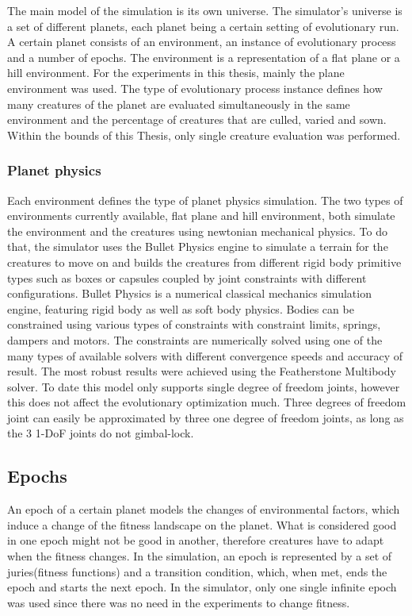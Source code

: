 \documentclass[main]{subfiles}
\begin{document}
The main model of the simulation is its own universe. %
%
The simulator's universe is a set of different planets, each planet being a certain setting of evolutionary run. %
%
A certain planet consists of an environment, an instance of evolutionary process and a number of epochs. %
%
The environment is a representation of a flat plane or a hill environment. %
%
For the experiments in this thesis, mainly the plane environment was used. %
%
The type of evolutionary process instance defines how many creatures of the planet are evaluated simultaneously in the same environment and the percentage of creatures that are culled, varied and sown. %
%
Within the bounds of this Thesis, only single creature evaluation was performed. 

\subsubsection{Planet physics}

Each environment defines the type of planet physics simulation. %
%
The two types of environments currently available, flat plane and hill environment, both simulate the environment and the creatures using newtonian mechanical physics. %
%
To do that, the simulator uses the Bullet Physics engine\cite{bib:BulletPhysics2015} to simulate a terrain for the creatures to move on and builds the creatures from different rigid body primitive types such as boxes or capsules coupled by joint constraints with different configurations. %
%
Bullet Physics is a numerical classical mechanics simulation engine, featuring rigid body as well as soft body physics. %
%
Bodies can be constrained using various types of constraints with constraint limits, springs, dampers and motors. %
%
The constraints are numerically solved using one of the many types of available solvers with different convergence speeds and accuracy of result. %
%
The most robust results were achieved using the Featherstone Multibody solver. %
%
To date this model only supports single degree of freedom joints, however this does not affect the evolutionary optimization much. %
%
Three degrees of freedom joint can easily be approximated by three one degree of freedom joints, as long as the 3 1-DoF joints do not gimbal-lock.

\subsection{Epochs}

An epoch of a certain planet models the changes of environmental factors, which induce a change of the fitness landscape on the planet. %
%
What is considered good in one epoch might not be good in another, therefore creatures have to adapt when the fitness changes. %
%
In the simulation, an epoch is represented by a set of juries(fitness functions) and a transition condition, which, when met, ends the epoch and starts the next epoch. %
%
In the simulator, only one single infinite epoch was used since there was no need in the experiments to change fitness.
\end{document}
